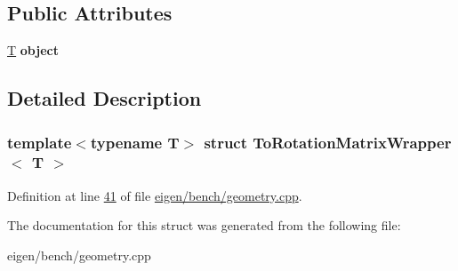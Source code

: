 \subsection*{Public Attributes}
\begin{DoxyCompactItemize}
\item 
\mbox{\label{struct_to_rotation_matrix_wrapper_ae0a4a0569c35462129f38924672ac596}} 
\hyperlink{group___sparse_core___module}{T} {\bfseries object}
\end{DoxyCompactItemize}


\subsection{Detailed Description}
\subsubsection*{template$<$typename T$>$\newline
struct To\+Rotation\+Matrix\+Wrapper$<$ T $>$}



Definition at line \hyperlink{eigen_2bench_2geometry_8cpp_source_l00041}{41} of file \hyperlink{eigen_2bench_2geometry_8cpp_source}{eigen/bench/geometry.\+cpp}.



The documentation for this struct was generated from the following file\+:\begin{DoxyCompactItemize}
\item 
eigen/bench/geometry.\+cpp\end{DoxyCompactItemize}
